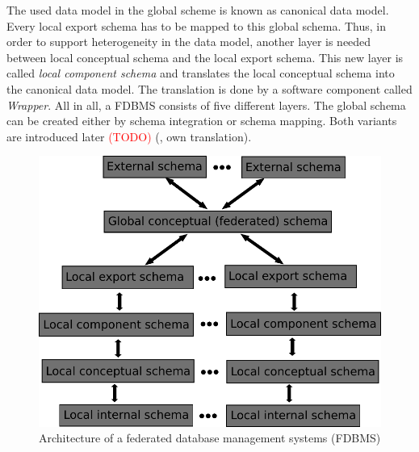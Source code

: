 The used data model in the global scheme is known as canonical data model. Every local export schema has to be mapped to this global schema. Thus, in order to support heterogeneity in the data model, another layer is needed between local conceptual schema and the local export schema. This new layer is called \textit{local component schema} and translates the local conceptual schema into the canonical data model. The translation is done by a software component called \textit{Wrapper}. All in all, a FDBMS consists of five different layers.
The global schema can be created either by schema integration or schema mapping. Both variants are introduced later \textcolor{red}{(TODO)}
(\cite[p. 94/95]{DBLP:books/dp/LeserN2006}, own translation).\\
\begin{figure}[H]
	\begin{center}
		\includegraphics[scale=0.5]{figures/federatedDatabaseArchitecture.pdf}
	\end{center}
	\caption{Architecture of a  federated database management systems (FDBMS)}
	\label{FDBMSArchitecture}
\end{figure}

